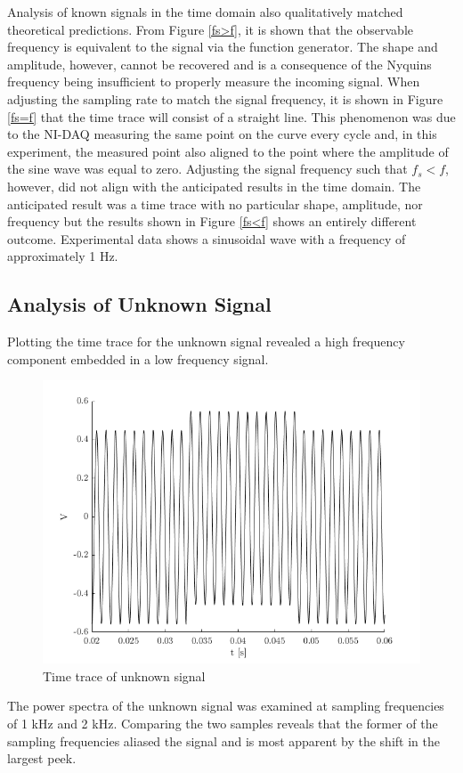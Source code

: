 \documentclass[letterpaper,12pt]{article}
\begin{document}
Analysis of known signals in the time domain also qualitatively matched theoretical predictions. From Figure \ref{fs>f}, it is shown that the observable frequency is equivalent to the signal via the function generator. The shape and amplitude, however, cannot be recovered and is a consequence of the Nyquins frequency being insufficient to properly measure the incoming signal. When adjusting the sampling rate to match the signal frequency, it is shown in Figure \ref{fs=f} that the time trace will consist of a straight line. This phenomenon was due to the NI-DAQ measuring the same point on the curve every cycle and, in this experiment, the measured point also aligned to the point where the amplitude of the sine wave was equal to zero. Adjusting the signal frequency such that $f_s < f $, however, did not align with the anticipated results in the time domain. The anticipated result was a time trace with no particular shape, amplitude, nor frequency but the results shown in Figure \ref{fs<f} shows an entirely different outcome. Experimental data shows a sinusoidal wave with a frequency of approximately 1 Hz.  

\subsection{Analysis of Unknown Signal}

Plotting the time trace for the unknown signal revealed a high frequency component embedded in a low frequency signal.

\begin{figure}[ht]
    \centering
    \includegraphics[width = .4\linewidth]{mysteryTime.png}
    \caption{Time trace of unknown signal}
    \label{UnknownTime}
\end{figure}

The power spectra of the unknown signal was examined at sampling frequencies of 1 kHz and 2 kHz. Comparing the two samples reveals that the former of the sampling frequencies aliased the signal and is most apparent by the shift in the largest peek.
\end{document}
